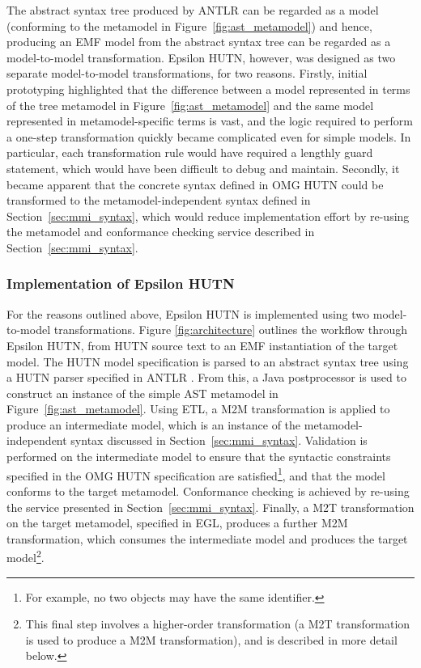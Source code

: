 The abstract syntax tree produced by ANTLR can be regarded as a model (conforming to the metamodel in Figure~\ref{fig:ast_metamodel}) and hence, producing an EMF model from the abstract syntax tree can be regarded as a model-to-model transformation. Epsilon HUTN, however, was designed as two separate model-to-model transformations, for two reasons. Firstly, initial prototyping highlighted that the difference between a model represented in terms of the tree metamodel in Figure~\ref{fig:ast_metamodel} and the same model represented in metamodel-specific terms is vast, and the logic required to perform a one-step transformation quickly became complicated even for simple models. In particular, each transformation rule would have required a lengthly guard statement, which would have been difficult to debug and maintain. Secondly, it became apparent that the concrete syntax defined in OMG HUTN could be transformed to the metamodel-independent syntax defined in Section~\ref{sec:mmi_syntax}, which would reduce implementation effort by re-using the metamodel and conformance checking service described in Section~\ref{sec:mmi_syntax}.

\subsubsection{Implementation of Epsilon HUTN}
For the reasons outlined above, Epsilon HUTN is implemented using two model-to-model transformations. Figure \ref{fig:architecture} outlines the workflow through Epsilon HUTN, from HUTN source text to an EMF instantiation of the target model. The HUTN model specification is parsed to an abstract syntax tree using a HUTN parser specified in ANTLR \cite{parr07antlr}. From this, a Java postprocessor is used to construct an instance of the simple AST metamodel in Figure~\ref{fig:ast_metamodel}. Using ETL, a M2M transformation is applied to produce an intermediate model, which is an instance of the metamodel-independent syntax discussed in Section~\ref{sec:mmi_syntax}. Validation is performed on the intermediate model to ensure that the syntactic constraints specified in the OMG HUTN specification are satisfied\footnote{For example, no two objects may have the same identifier.}, and that the model conforms to the target metamodel. Conformance checking is achieved by re-using the service presented in Section~\ref{sec:mmi_syntax}. Finally, a M2T transformation on the target metamodel, specified in EGL, produces a further M2M transformation, which consumes the intermediate model and produces the target model\footnote{This final step involves a higher-order transformation (a M2T transformation is used to produce a M2M transformation), and is described in more detail below.}.

